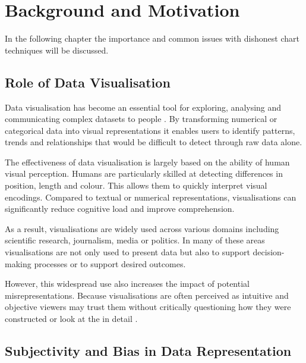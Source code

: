 %
%
% 
% 
% 


\chapter{Background and Motivation}

\label{chap:Background}
 In the following chapter the importance and common issues with dishonest chart techniques will be discussed.


\section{Role of Data Visualisation}

Data visualisation has become an essential tool for exploring, analysing and communicating complex datasets to people \cite{tufte2001,cairo2019}. By transforming numerical or categorical data into visual representations it enables users to identify patterns, trends and relationships that would be difficult to detect through raw data alone.

The effectiveness of data visualisation is largely based on the ability of human visual perception. Humans are particularly skilled at detecting differences in position, length and colour. This allows them to quickly interpret visual encodings. Compared to textual or numerical representations, visualisations can significantly reduce cognitive load and improve comprehension.

As a result, visualisations are widely used across various domains including scientific research, journalism, media or politics. In many of these areas visualisations are not only used to present data but also to support decision-making processes or to support desired outcomes.

However, this widespread use also increases the impact of potential misrepresentations. Because visualisations are often perceived as intuitive and objective viewers may trust them without critically questioning how they were constructed or look at the in detail \cite{cairo2019}.

\section{Subjectivity and Bias in Data Representation}

